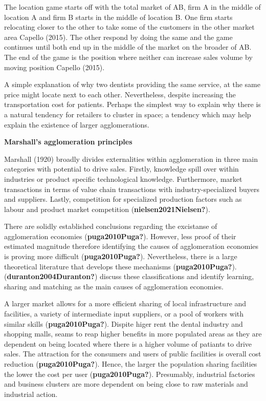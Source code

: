 \documentclass[
  10,
  a4paper,
]{article}
\begin{document}
The location game starts off with the total market of AB, firm A in the
middle of location A and firm B starts in the middle of location B. One
firm starts relocating closer to the other to take some of the customers
in the other market area Capello (2015). The other respond by doing the
same and the game continues until both end up in the middle of the
market on the broader of AB. The end of the game is the position where
neither can increase sales volume by moving position Capello (2015).

A simple explanation of why two dentists providing the same service, at
the same price might locate next to each other. Nevertheless, despite
increasing the transportation cost for patients. Perhaps the simplest
way to explain why there is a natural tendency for retailers to cluster
in space; a tendency which may help explain the existence of larger
agglomerations.

\textbf{Marshall's agglomeration principles}

Marshall (1920) broadly divides externalities within agglomeration in
three main categories with potential to drive sales. Firstly, knowledge
spill over within industries or product specific technological
knowledge. Furthermore, market transactions in terms of value chain
transactions with industry-specialized buyers and suppliers. Lastly,
competition for specialized production factors such as labour and
product market competition (\textbf{nielsen2021Nielsen?}).

There are solidly established conclusions regarding the excistanse of
agglomeration economies (\textbf{puga2010Puga?}). However, less proof of
their estimated magnitude therefore identifying the causes of
agglomeration economies is proving more difficult
(\textbf{puga2010Puga?}). Nevertheless, there is a large theoretical
literature that develops these mechanisms (\textbf{puga2010Puga?}).
(\textbf{duranton2004Duranton?}) discuss these classifications and
identify learning, sharing and matching as the main causes of
agglomeration economies.

A larger market allows for a more efficient sharing of local
infrastructure and facilities, a variety of intermediate input
suppliers, or a pool of workers with similar skills
(\textbf{puga2010Puga?}). Dispite higer rent the dental industry and
shopping malls, seams to reap higher benefits in more populated areas as
they are dependent on being located where there is a higher volume of
patiants to drive sales. The attraction for the consumers and users of
public facilities is overall cost reduction (\textbf{puga2010Puga?}).
Hence, the larger the population sharing facilities the lower the cost
per user (\textbf{puga2010Puga?}). Presumably, industrial factories and
business clusters are more dependent on being close to raw materials and
industrial action.
\end{document}
